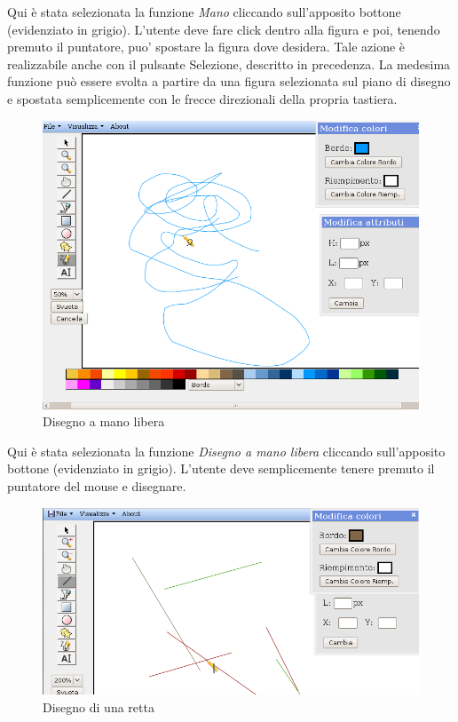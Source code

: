\vspace{300pt}
Qui \`e stata selezionata la funzione \textit{Mano} cliccando sull'apposito bottone (evidenziato in grigio). L'utente deve fare click dentro alla figura e poi, tenendo premuto il puntatore, puo' spostare la figura dove desidera. Tale azione \`e realizzabile anche con il pulsante Selezione, descritto in precedenza. La medesima funzione pu\`o essere svolta a partire da una figura selezionata sul piano di disegno e spostata semplicemente con le frecce direzionali della propria tastiera. \\

\begin{figure}[!ht]
\centering
\includegraphics[scale=0.4]{images/matita.png}
\caption{Disegno a mano libera}
\end{figure} 

\vspace{300pt}
Qui \`e stata selezionata la funzione \textit{Disegno a mano libera} cliccando sull'apposito bottone (evidenziato in grigio). L'utente deve semplicemente tenere premuto il puntatore del mouse e disegnare. \\

\begin{figure}[!ht]
\centering
\includegraphics[scale=0.4]{images/linea.png}
\caption{Disegno di una retta}
\end{figure} 

